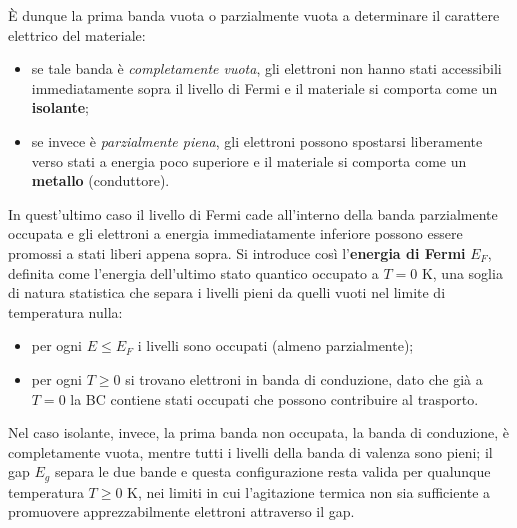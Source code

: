 È dunque la prima banda vuota o parzialmente vuota a determinare il carattere elettrico del materiale:

\begin{itemize}
    \item se tale banda è \emph{completamente vuota}, gli elettroni non hanno stati accessibili immediatamente sopra il livello di Fermi e il materiale si comporta come un \textbf{isolante};
    \item se invece è \emph{parzialmente piena}, gli elettroni possono spostarsi liberamente verso stati a energia poco superiore e il materiale si comporta come un \textbf{metallo} (conduttore).
\end{itemize}

In quest'ultimo caso il livello di Fermi cade all'interno della banda parzialmente occupata e gli elettroni a energia immediatamente inferiore possono essere promossi a stati liberi appena sopra. Si introduce così l'\textbf{energia di Fermi} \( E_F \), definita come l'energia dell'ultimo stato quantico occupato a \( T = 0 \) K, una soglia di natura statistica che separa i livelli pieni da quelli vuoti nel limite di temperatura nulla:
\begin{itemize}
    \item per ogni \( E \le E_F \) i livelli sono occupati (almeno parzialmente);
    \item per ogni \( T \ge 0 \) si trovano elettroni in banda di conduzione, dato che già a \( T = 0 \) la BC contiene stati occupati che possono contribuire al trasporto.
\end{itemize}

Nel caso isolante, invece, la prima banda non occupata, la banda di conduzione, è completamente vuota, mentre tutti i livelli della banda di valenza sono pieni; il gap \( E_g \) separa le due bande e questa configurazione resta valida per qualunque temperatura \( T \ge 0 \) K, nei limiti in cui l'agitazione termica non sia sufficiente a promuovere apprezzabilmente elettroni attraverso il gap.

